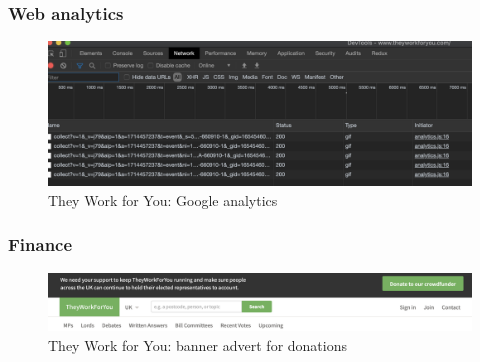 \documentclass{article}
\begin{document}
        	\subsubsection*{Web analytics}
        	
        	
			\begin{figure}
				\centering
				\includegraphics[scale=0.4]{images/they-work-for-you-challenges-google-analytics}
				\caption{They Work for You: Google analytics}
				\label{fig:they-work-for-you-challenges-google-analytics}
			\end{figure}
			
        	\subsubsection*{Finance}
        	    

			\begin{figure}
				\includegraphics[scale=0.4]{images/they-work-for-you-challenges-finance}
				\caption{They Work for You: banner advert for donations}
				\label{fig:they-work-for-you-challenges-finance}
			\end{figure}
			
\end{document}
